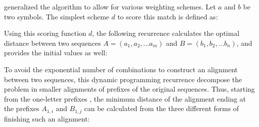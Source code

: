 
\citeauthor{sellers:1974a} generalized the algorithm to allow for various weighting schemes. Let $a$ and $b$ be two
symbols. The simplest scheme $d$ to score this match is defined as:

\begin{center}
\end{center}

Using this scoring function $d$, the following recurrence calculates the optimal distance between two
sequences $A = (a_1, a_2, \ldots a_m)$ and $B = (b_1, b_2, \ldots b_n)$, and provides the initial values as well:

\begin{center}
\end{center}

To avoid the exponential number of combinations to construct an alignment between two sequences, this
dynamic programming recurrence decompose the problem in smaller alignments of prefixes of the original
sequences. Thus, starting from the one-letter prefixes , the minimum distance of the alignment 
ending at the prefixes $A_{1,i}$ and $B_{1,j}$ can be calculated from the three different forms of finishing
such an alignment:

